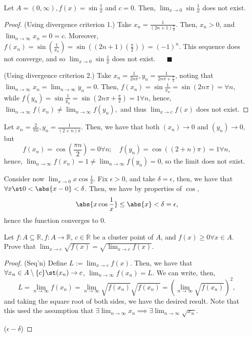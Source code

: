 \documentclass[12pt]{article}
\renewcommand{\qedsymbol}{$\blacksquare$}
\begin{document}
\begin{example}[$f(x) = \sin \frac{1}{x}$]
  Let $A = (0, \infty), f(x) = \sin \frac{1}{x}$ and $c = 0$. Then, $\lim_{x \to 0} \sin \frac{1}{x}$ does not exist.
  \begin{proof}
    (Using divergence criterion 1.) Take $x_n = \frac{1}{(2n+1) \frac{\pi}{2}}$. Then, $x_n > 0$, and $\lim_{n \to \infty} x_n = 0 = c$. Moreover, $f(x_n) = \sin (\frac{1}{x_n}) = \sin ((2n+1)(\frac{\pi}{2})) = (-1)^{n}$. This sequence does not converge, and so $\lim_{x \to 0} \sin \frac{1}{x}$ does not exist. $\quad$ \qedsymbol

    \noindent(Using divergence criterion 2.) Take $x_n = \frac{1}{2n\pi}, y_n = \frac{1}{2n\pi + \frac{\pi}{2}}$, noting that $\lim_{n\to\infty} x_n = \lim_{n \to \infty} y_n = 0$. Then, $f(x_n) = \sin \frac{1}{x_n} = \sin (2n \pi) = \forall n$, while $f(y_n) = \sin \frac{1}{y_n} = \sin (2n \pi + \frac{\pi}{2}) = 1 \forall n$, hence, $\lim_{n\to\infty} f(x_n) \neq \lim_{n\to\infty} f(y_n),$ and thus $\lim_{x\to c} f(x)$ does not exist.
  \end{proof}
\end{example}

\begin{example}[Abbott, 4.2E2]
  Let $x_n = \frac{2}{\pi n}, y_n = \frac{1}{(2+n)\pi}$. Then, we have that both $(x_n) \to 0$ and $(y_n) \to 0$, but \[
  f(x_n) = \cos (\frac{\pi n}{2}) = 0 \forall n; \quad f(y_n) = \cos ((2 + n) \pi) = 1 \forall n,
  \]
  hence, $\lim_{n\to\infty} f(x_n) = 1 \neq \lim_{n\to\infty}f(y_n) = 0$, so the limit does not exist.

  Consider now $\lim_{x\to 0} x \cos \frac{1}{x}$. Fix $\epsilon > 0$, and take $\delta = \epsilon$, then, we have that $\forall x \st 0 < \abs{x - 0} < \delta$. Then, we have by properties of $\cos$, \[
  \abs{x \cos \frac{1}{x}} \leq \abs{x} < \delta = \epsilon,
  \]
  hence the function converges to $0$.
\end{example}

\begin{example}[Abbott, 4.2E14]
  Let $f : A \subseteq \mathbb{R}, f : A \to \mathbb{R}$, $c \in \mathbb{R}$ be a cluster point of $A$, and $f(x) \geq 0 \forall x \in A$. Prove that $\lim_{x \to c} \sqrt{f(x)} = \sqrt{ \lim_{x\to c}f(x)}$.
  \begin{proof}
    (Seq'n) Define $L := \lim_{x\to c} f(x)$. Then, we have that $\forall x_n \in A\setminus\{c\} \st (x_n) \to c$, $\lim_{n\to\infty} f(x_n) = L$. We can write, then,
    \[
    L = \lim_{n \to \infty} f(x_n) = \lim_{n\to\infty} \sqrt{f(x_n)}\sqrt{f(x_n)} = \left(\lim_{n\to\infty}\sqrt{f(x_n)}\right)^{2},
    \]
    and taking the square root of both sides, we have the desired result. Note that this used the assumption that $\exists\lim_{n\to\infty} x_n \implies \exists\lim_{n\to\infty} \sqrt{x_n}$.


    \noindent($\epsilon-\delta$) %

  \end{proof}
\end{example}
\end{document}
